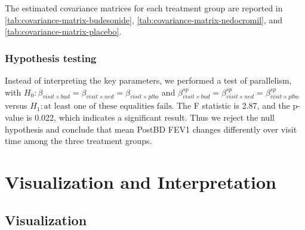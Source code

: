 \documentclass[12pt]{article}
\begin{document}
The estimated covariance matrices for each treatment group
are reported in \cref{tab:covariance-matrix-budesonide},
\cref{tab:covariance-matrix-nedocromil}, and
\cref{tab:covariance-matrix-placebo}.

\begin{table}[htbp]
  \centering
  \caption{Estimated covariance matrix under the final model (Budesonide)}
  \label{tab:covariance-matrix-budesonide}
  \begingroup\let\small\scriptsize\makebox[\textwidth][c]{}\endgroup
\end{table}

\begin{table}[htbp]
  \centering
  \caption{Estimated covariance matrix under the final model (Nedocromil)}
  \label{tab:covariance-matrix-nedocromil}
  \begingroup\let\small\scriptsize\makebox[\textwidth][c]{}\endgroup
\end{table}

\begin{table}[htbp]
  \centering
  \caption{Estimated covariance matrix under the final model (Placebo)}
  \label{tab:covariance-matrix-placebo}
  \begingroup\let\small\scriptsize\makebox[\textwidth][c]{}\endgroup
\end{table}

\subsubsection{Hypothesis testing}

Instead of interpreting the key parameters, we performed a test of
parallelism, with 
$H_0: \beta_{visit \times bud} = \beta_{visit \times ned} = \beta_{visit \times plbo}$
and $\beta_{visit \times bud}^{sp} = \beta_{visit \times ned}^{sp} = \beta_{visit \times plbo}^{sp}$
versus $H_1: \text{at least one of these equalities fails}$.
The F statistic is 2.87, and the p-value is 0.022,
which indicates a significant result. Thus we reject
the null hypothesis and conclude that mean PostBD FEV1 changes
differently over visit time among the three treatment groups.

\section{Visualization and Interpretation}

\subsection{Visualization}
\end{document}
